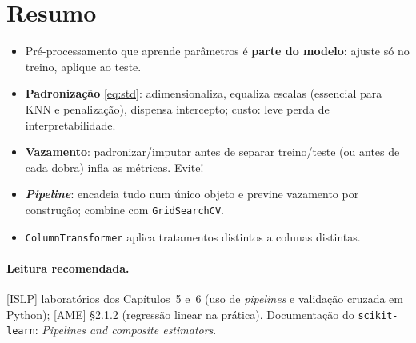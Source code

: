 \documentclass[11pt,a4paper]{article}
\begin{document}
\section*{Resumo}
\begin{itemize}[leftmargin=1.4cm]
  \item Pré-processamento que aprende parâmetros é \textbf{parte do modelo}: ajuste
        só no treino, aplique ao teste.
  \item \textbf{Padronização} \eqref{eq:std}: adimensionaliza, equaliza escalas
        (essencial para KNN e penalização), dispensa intercepto; custo: leve perda
        de interpretabilidade.
  \item \textbf{Vazamento}: padronizar/imputar antes de separar treino/teste (ou
        antes de cada dobra) infla as métricas. Evite!
  \item \textbf{\emph{Pipeline}}: encadeia tudo num único objeto e previne
        vazamento por construção; combine com \texttt{GridSearchCV}.
  \item \texttt{ColumnTransformer} aplica tratamentos distintos a colunas distintas.
\end{itemize}

\paragraph{Leitura recomendada.} [ISLP] laboratórios dos Capítulos~5 e~6 (uso de
\emph{pipelines} e validação cruzada em Python); [AME] §2.1.2 (regressão linear na
prática). Documentação do \texttt{scikit-learn}: \emph{Pipelines and composite
estimators}.
\end{document}
